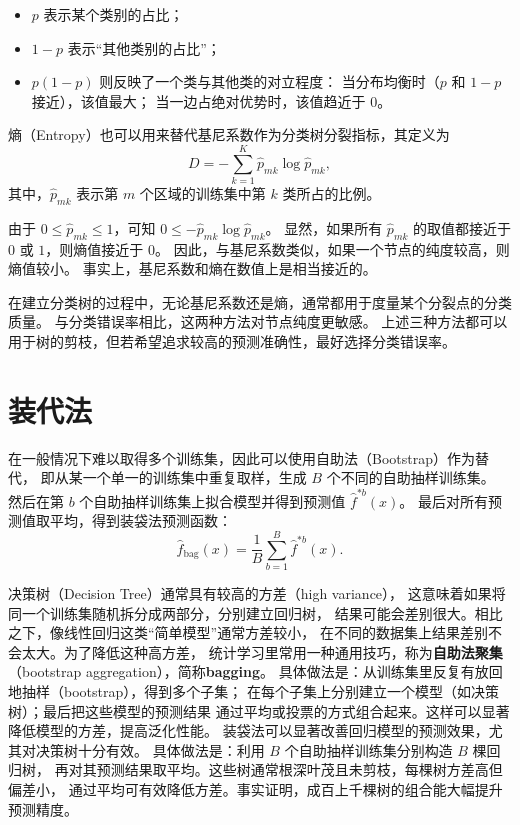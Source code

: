 \begin{itemize}
  \item $p$ 表示某个类别的占比；
  \item $1-p$ 表示“其他类别的占比”；
  \item $p(1-p)$ 则反映了一个类与其他类的对立程度：
    当分布均衡时（$p$ 和 $1-p$ 接近），该值最大；
    当一边占绝对优势时，该值趋近于 $0$。
\end{itemize}
熵（Entropy）也可以用来替代基尼系数作为分类树分裂指标，其定义为
\[
D = - \sum_{k=1}^K \hat{p}_{mk} \log \hat{p}_{mk},
\tag{8.7}
\]
其中，$\hat{p}_{mk}$ 表示第 $m$ 个区域的训练集中第 $k$ 类所占的比例。

由于 $0 \leq \hat{p}_{mk} \leq 1$，可知 $0 \leq - \hat{p}_{mk}\log \hat{p}_{mk}$。
显然，如果所有 $\hat{p}_{mk}$ 的取值都接近于 $0$ 或 $1$，则熵值接近于 $0$。
因此，与基尼系数类似，如果一个节点的纯度较高，则熵值较小。
事实上，基尼系数和熵在数值上是相当接近的。

在建立分类树的过程中，无论基尼系数还是熵，通常都用于度量某个分裂点的分类质量。
与分类错误率相比，这两种方法对节点纯度更敏感。
上述三种方法都可以用于树的剪枝，但若希望追求较高的预测准确性，最好选择分类错误率。
\section{装代法}
\begin{definition}
在一般情况下难以取得多个训练集，因此可以使用自助法（Bootstrap）作为替代，
即从某一个单一的训练集中重复取样，生成 $B$ 个不同的自助抽样训练集。
然后在第 $b$ 个自助抽样训练集上拟合模型并得到预测值 $\hat{f}^{*b}(x)$。
最后对所有预测值取平均，得到装袋法预测函数：
\[
\hat{f}_{\text{bag}}(x) = \frac{1}{B} \sum_{b=1}^B \hat{f}^{*b}(x).
\]
\end{definition}
决策树（Decision Tree）通常具有较高的方差（high variance），
这意味着如果将同一个训练集随机拆分成两部分，分别建立回归树，
结果可能会差别很大。相比之下，像线性回归这类“简单模型”通常方差较小，
在不同的数据集上结果差别不会太大。为了降低这种高方差，
统计学习里常用一种通用技巧，称为\textbf{自助法聚集}
（bootstrap aggregation），简称\textbf{bagging}。
具体做法是：从训练集里反复有放回地抽样（bootstrap），得到多个子集；
在每个子集上分别建立一个模型（如决策树）；最后把这些模型的预测结果
通过平均或投票的方式组合起来。这样可以显著降低模型的方差，提高泛化性能。
装袋法可以显著改善回归模型的预测效果，尤其对决策树十分有效。
具体做法是：利用 $B$ 个自助抽样训练集分别构造 $B$ 棵回归树，
再对其预测结果取平均。这些树通常根深叶茂且未剪枝，每棵树方差高但偏差小，
通过平均可有效降低方差。事实证明，成百上千棵树的组合能大幅提升预测精度。

